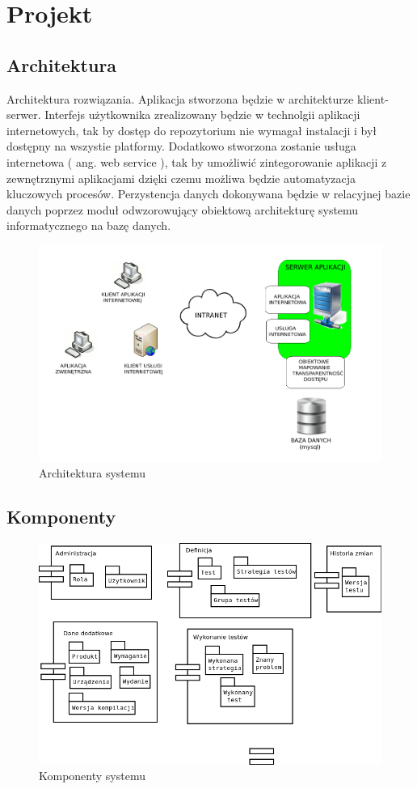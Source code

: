 \chapter{Projekt}
\section{Architektura}
Architektura rozwiązania. Aplikacja stworzona będzie w architekturze klient-serwer. Interfejs użytkownika zrealizowany będzie w technolgii aplikacji internetowych, tak by dostęp do repozytorium nie wymagał instalacji i był dostępny na wszystie platformy. Dodatkowo stworzona zostanie usługa internetowa ( ang. web service ), tak by umożliwić zintegorowanie aplikacji z zewnętrznymi aplikacjami dzięki czemu możliwa będzie automatyzacja kluczowych procesów. Perzystencja danych dokonywana będzie w relacyjnej bazie danych poprzez moduł odwzorowujący obiektową architekturę systemu informatycznego na bazę danych.
\begin{figure}[h]
\centerline{\includegraphics[scale=0.5]{img/architektura.png}}
\caption{Architektura systemu}
\label{fig:architektura}
\end{figure}
\section{Komponenty}
\begin{figure}[h]
\centerline{\includegraphics[scale=0.5]{img/komponenty.png}}
\caption{Komponenty systemu}
\label{fig:architektura}
\end{figure}

